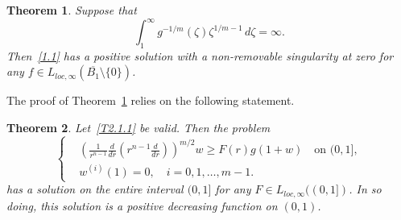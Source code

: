 \documentclass[11pt]{amsart}
\newtheorem{theorem}{Theorem}[section]
\theoremstyle{definition}
\numberwithin{equation}{section}
\begin{document}
\begin{theorem}\label{T2.1}
Suppose that
\begin{equation}
	\int_1^\infty
	g^{- 1 / m} (\zeta)
	\zeta^{1 / m - 1}
	\,
	d\zeta
	=
	\infty.
	\label{T2.1.1}
\end{equation}
Then~\eqref{1.1}
has a positive solution with a non-removable singularity at zero for any $f \in L_{loc, \infty} (\overline{B_1} \setminus \{ 0 \})$.
\end{theorem}

The proof of Theorem~\ref{T2.1} relies on the following statement.

\begin{theorem}\label{T2.2}
Let~\eqref{T2.1.1} be valid. Then the problem
\begin{equation}
	\left\{
		\begin{aligned}
			&
			\left(
				\frac{
					1
				}{
					r^{n-1}
				}
				\frac{d}{dr}
				\left(
					r^{n-1}
					\frac{d}{dr}
				\right)
			\right)^{m/2}
			w
			\ge
			F (r)
			g (1 + w)
			\quad
			\mbox{on } (0, 1],
			\\
			&
			w^{(i)} (1) = 0,
			\quad
			i = 0, 1, \ldots, m - 1.
		\end{aligned}
	\right.
	\label{T2.2.1}		
\end{equation}
has a solution on the entire interval $(0, 1]$ for any $F \in L_{loc, \infty} ((0, 1])$.
In so doing, this solution is a positive decreasing function on $(0, 1)$.
\end{theorem}
\end{document}
